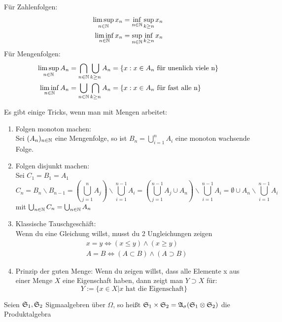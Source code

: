 		\begin{defi}
			Für Zahlenfolgen:
			\begin{align*}
				\limsup_{n \in \mathbb{N}} x_n &= \inf_{n \in \mathbb{N}} \sup_{k \geq n} x_n\\
				\liminf_{n \in \mathbb{N}} x_n &= \sup_{n \in \mathbb{N}} \inf_{k \geq n} x_n
			\end{align*}
			Für Mengenfolgen:
			\begin{align*}
			\limsup_{n \in \mathbb{N}} A_n &= \bigcap_{n \in \mathbb{N}} \bigcup_{k \geq n} A_n=\{ x:x \in A_n \text{ für unenlich viele n} \}\\
			\liminf_{n \in \mathbb{N}} A_n &= \bigcup_{n \in \mathbb{N}} \bigcap_{k \geq n} A_n=\{ x:x \in A_n \text{ für fast alle n} \}
			\end{align*}
		\end{defi}
		\begin{bem} Es gibt einige Tricks, wenn man mit Mengen arbeitet:
			\begin{enumerate}[1.]
				\item Folgen monoton machen:\\
					Sei $(A_n)_{n \in \mathbb{N}}$ eine Mengenfolge, so ist $B_n=\bigcup_{i=1}^n A_i$ eine monoton wachsende Folge.
				\item Folgen disjunkt machen:\\
					Sei $C_1 =B_1=A_1$
					\[ C_n=B_n \backslash B_{n-1} = \left (\bigcup_{j=1}^{n}A_j \right ) \backslash \bigcup_{i=1}^{n-1} A_i=
					\left ( \bigcup_{j=1}^{n-1}A_j \cup A_n \right ) \backslash \bigcup_{i=1}^{n-1} A_i = \emptyset \cup A_n \backslash \bigcup_{i=1}^{n-1} A_i  \]
					mit $ \bigcup_{n \in \mathbb{N}} C_n = \bigcup_{n \in \mathbb{N}} A_n$
				\item Klassische Tauschgeschäft:\\
					Wenn du eine Gleichung willst, musst du 2 Ungleichungen zeigen
					\begin{align*}
						&x=y \Leftrightarrow (x \leq y) \wedge (x \geq y)\\
						&A=B \Leftrightarrow (A \subset B) \wedge (A \supset B)
					\end{align*}
				\item Prinzip der guten Menge:
					Wenn du zeigen willst, dass alle Elemente x aus einer Menge $X$ eine Eigenschaft haben, dann zeigt man $ Y \supset X $ für:
					\[ Y:=\{ x \in X | x \text{ hat die Eigenschaft} \} \]
			\end{enumerate}
		\end{bem}
		
		\begin{defi}
			Seien $\mathfrak{S}_1, \mathfrak{S}_2$ Sigmaalgebren über $\Omega$, so heißt $ \mathfrak{S}_1 \times \mathfrak{S}_2 = \mathfrak{A}_\sigma(\mathfrak{S}_1 \otimes \mathfrak{S}_2) $ die Produktalgebra
		\end{defi}
		
